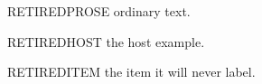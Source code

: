 

RETIREDPROSE ordinary text.
\begin{exe}
\ex RETIREDHOST the host example.
\begin{xlistabr}\ex RETIREDITEM the item it will never label. \end{xlistabr}
\end{exe}


